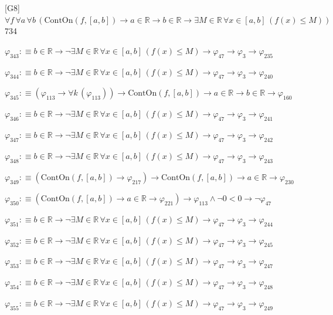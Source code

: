 \begin{fullproof}{[G8]}{$\forall f\,\forall a\,\forall b\,(\mathrm{ContOn}(f,[a,b]) \to a \in \mathbb{R} \to b \in \mathbb{R} \to \exists M \in \mathbb{R}\,\forall x \in [a,b]\,(f(x) \leq M))$}{734}
\begin{abbrevlist}
\item $\varphi_{343} :\equiv b \in \mathbb{R} \to \neg \exists M \in \mathbb{R}\,\forall x \in [a,b]\,(f(x) \leq M) \to \varphi_{47} \to \varphi_{3} \to \varphi_{235}$
\item $\varphi_{344} :\equiv b \in \mathbb{R} \to \neg \exists M \in \mathbb{R}\,\forall x \in [a,b]\,(f(x) \leq M) \to \varphi_{47} \to \varphi_{3} \to \varphi_{240}$
\item $\varphi_{345} :\equiv (\varphi_{113} \to \forall k\,(\varphi_{113})) \to \mathrm{ContOn}(f,[a,b]) \to a \in \mathbb{R} \to b \in \mathbb{R} \to \varphi_{160}$
\item $\varphi_{346} :\equiv b \in \mathbb{R} \to \neg \exists M \in \mathbb{R}\,\forall x \in [a,b]\,(f(x) \leq M) \to \varphi_{47} \to \varphi_{3} \to \varphi_{241}$
\item $\varphi_{347} :\equiv b \in \mathbb{R} \to \neg \exists M \in \mathbb{R}\,\forall x \in [a,b]\,(f(x) \leq M) \to \varphi_{47} \to \varphi_{3} \to \varphi_{242}$
\item $\varphi_{348} :\equiv b \in \mathbb{R} \to \neg \exists M \in \mathbb{R}\,\forall x \in [a,b]\,(f(x) \leq M) \to \varphi_{47} \to \varphi_{3} \to \varphi_{243}$
\item $\varphi_{349} :\equiv (\mathrm{ContOn}(f,[a,b]) \to \varphi_{217}) \to \mathrm{ContOn}(f,[a,b]) \to a \in \mathbb{R} \to \varphi_{230}$
\item $\varphi_{350} :\equiv (\mathrm{ContOn}(f,[a,b]) \to a \in \mathbb{R} \to \varphi_{221}) \to \varphi_{113} \land \neg 0 < 0 \to \neg \varphi_{47}$
\item $\varphi_{351} :\equiv b \in \mathbb{R} \to \neg \exists M \in \mathbb{R}\,\forall x \in [a,b]\,(f(x) \leq M) \to \varphi_{47} \to \varphi_{3} \to \varphi_{244}$
\item $\varphi_{352} :\equiv b \in \mathbb{R} \to \neg \exists M \in \mathbb{R}\,\forall x \in [a,b]\,(f(x) \leq M) \to \varphi_{47} \to \varphi_{3} \to \varphi_{245}$
\item $\varphi_{353} :\equiv b \in \mathbb{R} \to \neg \exists M \in \mathbb{R}\,\forall x \in [a,b]\,(f(x) \leq M) \to \varphi_{47} \to \varphi_{3} \to \varphi_{247}$
\item $\varphi_{354} :\equiv b \in \mathbb{R} \to \neg \exists M \in \mathbb{R}\,\forall x \in [a,b]\,(f(x) \leq M) \to \varphi_{47} \to \varphi_{3} \to \varphi_{248}$
\item $\varphi_{355} :\equiv b \in \mathbb{R} \to \neg \exists M \in \mathbb{R}\,\forall x \in [a,b]\,(f(x) \leq M) \to \varphi_{47} \to \varphi_{3} \to \varphi_{249}$

\end{abbrevlist}
\end{fullproof}
